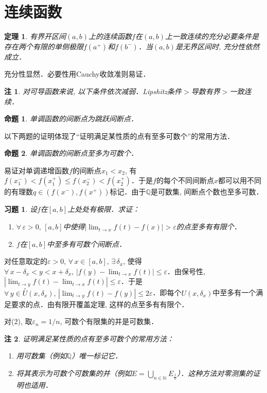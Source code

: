 \documentclass[11pt,a4paper]{ctexart}
\makeatletter
\theoremstyle{thmseries} %
\newtheorem{thm}{定理}[section]
\newtheorem{prop}{命题}[section]
\theoremstyle{exerseries}
\newtheorem{exer}{习题}[section]
\newtheorem*{rem}{注}
\renewenvironment{proof}[1][\proofname]{\par
  \pushQED{\qed}%
  \normalfont \topsep6\p@\@plus6\p@\relax
  \trivlist
  \item[\hskip\labelsep
        \itshape
    #1\@addpunct{}]\ignorespaces
}{%
  \popQED\endtrivlist\@endpefalse
}
\newenvironment{pf}{\begin{proof}[\bfseries\upshape 证\quad]}{\end{proof}}
\newcommand{\bra}[1]{\mathopen{}\left(#1\right)}
\renewcommand{\epsilon}{\varepsilon}
\newcommand{\dnei}{\overset{\circ}{U}}
\newcommand{\N}{\mathbb{N}}
\newcommand{\Q}{\mathbb{Q}}
\makeatother
\begin{document}
\section{连续函数}
\begin{thm}
	有界开区间$(a,b)$上的连续函数$f$在$(a,b)$上一致连续的充分必要条件是存在两个有限的单侧极限$f(a^+)$和$f(b^-)$．当$(a,b)$是无界区间时, 充分性依然成立．
\end{thm}
\begin{pf}
	充分性显然．必要性用Cauchy收敛准则易证．
\end{pf}
\begin{rem}
	对可导函数来说, 以下条件依次减弱．Lipshitz条件$>$导数有界$>$一致连续．
\end{rem}

\begin{prop}
	单调函数的间断点为跳跃间断点．
\end{prop}

以下两题的证明体现了``证明满足某性质的点有至多可数个''的常用方法．
\begin{prop}
	单调函数的间断点至多为可数个．
\end{prop}
\begin{pf}
	易证对单调递增函数$f$的间断点$x_1<x_2$, 有$f(x_1^-)<f(x_1^+)\leq f(x_2^-)<f(x_2^+)$．于是$f$的每个不同间断点$x$都可以用不同的有理数$q\in\bra{f(x^-),f(x^+)}$标记．由于$\Q$是可数集, 间断点个数也至多可数．
\end{pf}

\begin{exer}
	设$f$在$[a,b]$上处处有极限．求证：
	\begin{enumerate}
		\item $\forall\,\epsilon>0,\,[a,b]$中使得$|\lim_{t\to x}f(t)-f(x)|>\epsilon$的点至多有有限个．
		\item $f$在$[a,b]$中至多有可数个间断点．
	\end{enumerate}
\end{exer}
\begin{pf}
	对任意取定的$\epsilon>0$, $\forall\,x\in[a,b],\,\exists\,\delta_x$, 使得$\forall\,x-\delta_x<y<x+\delta_x,\,|f(y)-\lim_{t\to x}f(t)|\leq\epsilon$．由保号性, $|\lim_{t\to y}f(t)-\lim_{t\to x}f(t)|\leq\epsilon$．于是$\forall\,y\in\dnei(x,\delta_x),\,|\lim_{t\to y}f(t)-f(y)|\leq2\epsilon$．即每个$U(x,\delta_x)$中至多有一个满足要求的点．由有限开覆盖定理, 这样的点至多有有限个．

	对(2), 取$\epsilon_n=1/n$, 可数个有限集的并是可数集．
\end{pf}
\begin{rem}
	证明满足某性质的点有至多可数个的常用方法：
	\begin{enumerate}
		\item 用可数集（例如$\Q$）唯一标记它．
		\item 将其表示为可数个可数集的并（例如$E=\bigcup_{n\in \N}E_{\frac{1}{n}}$）．这种方法对零测集的证明也适用．
	\end{enumerate}
\end{rem}
\end{document}
